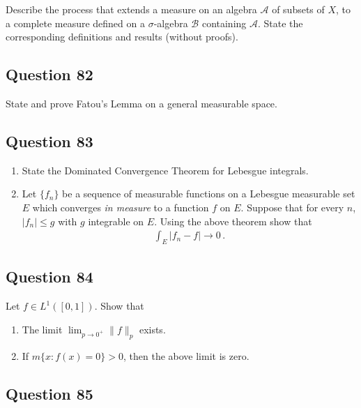 \documentclass[12pt]{article}
\begin{document}
Describe the process that extends a measure on an algebra
\(\mathcal{A}\) of subsets of \(X\), to a complete measure defined on a
\(\sigma\)-algebra \(\mathcal{B}\) containing \(\mathcal{A}\). State the
corresponding definitions and results (without proofs).

\hypertarget{question-82-1}{%
\subsection{Question 82}\label{question-82-1}}

State and prove Fatou's Lemma on a general measurable space.

\hypertarget{question-83-1}{%
\subsection{Question 83}\label{question-83-1}}

\begin{enumerate}
\def\labelenumi{\arabic{enumi}.}
\item
  State the Dominated Convergence Theorem for Lebesgue integrals.
\item
  Let \(\{f_n\}\) be a sequence of measurable functions on a Lebesgue
  measurable set \(E\) which converges \emph{in measure} to a function
  \(f\) on \(E\). Suppose that for every \(n\), \(|f_n| \leq g\) with
  \(g\) integrable on \(E\). Using the above theorem show that
  \begin{align*}
      \int_E |f_n-f| \longrightarrow 0 \, .
  \end{align*}
\end{enumerate}

\hypertarget{question-84-1}{%
\subsection{Question 84}\label{question-84-1}}

Let \(f\in L^1([0,1])\). Show that

\begin{enumerate}
\def\labelenumi{\arabic{enumi}.}
\item
  The limit \(\lim_{p\to 0^+} \| f \|_p\) exists.
\item
  If \(m \{x : f(x) = 0\} > 0\), then the above limit is zero.
\end{enumerate}

\hypertarget{question-85-1}{%
\subsection{Question 85}\label{question-85-1}}
\end{document}
